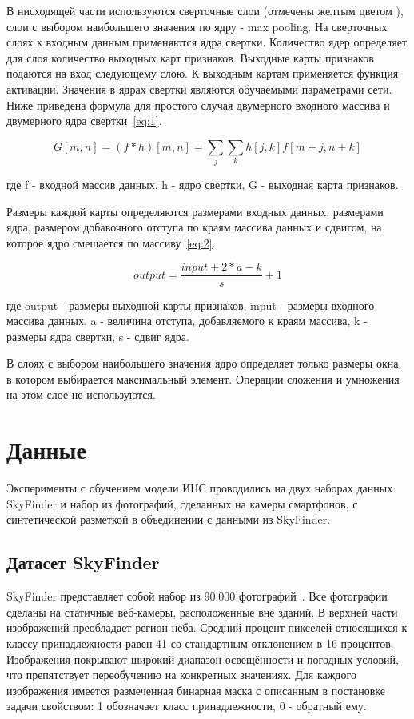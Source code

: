 В нисходящей части используются сверточные слои (отмечены желтым цветом ), слои с выбором наибольшего значения по ядру - max pooling.
На сверточных слоях к входным данным применяются ядра свертки.
Количество ядер определяет для слоя количество выходных карт признаков.
Выходные карты признаков подаются на вход следующему слою.
К выходным картам применяется функция активации.
Значения в ядрах свертки являются обучаемыми параметрами сети.
Ниже приведена формула для простого случая двумерного входного массива и двумерного ядра свертки~\eqref{eq:1}.

\begin{equation}
    \label{eq:1}
    G[m, n] = (f*h)[m, n] = \sum_{j}{\sum_{k}{h[j, k]f[m + j, n + k]}}
\end{equation}

где f - входной массив данных, h - ядро свертки, G - выходная карта признаков.

Размеры каждой карты определяются размерами входных данных, размерами ядра, размером добавочного отступа по краям массива данных и сдвигом,
на которое ядро смещается по массиву~\eqref{eq:2}.

\begin{equation}
    \label{eq:2}
    output = \frac{input + 2 * a - k}{s} + 1
\end{equation}

где output - размеры выходной карты признаков, input - размеры входного массива данных, a - величина отступа, добавляемого к краям массива,
k - размеры ядра свертки, s - сдвиг ядра.

В слоях с выбором наибольшего значения ядро определяет только размеры окна, в котором выбирается максимальный элемент.
Операции сложения и умножения на этом слое не используются.


\section{Данные}

Эксперименты с обучением модели ИНС проводились на двух наборах данных: SkyFinder и набор из фотографий, сделанных на камеры смартфонов,
с синтетической разметкой в объединении с данными из SkyFinder.

\subsection{Датасет SkyFinder}

SkyFinder представляет собой набор из 90.000 фотографий~\autocite{mihail2016sky}.
Все фотографии сделаны на статичные веб-камеры, расположенные вне зданий.
В верхней части изображений преобладает регион неба.
Средний процент пикселей относящихся к классу принадлежности равен 41 со стандартным отклонением в 16 процентов.
Изображения покрывают широкий диапазон освещённости и погодных условий, что препятствует переобучению на конкретных значениях.
Для каждого изображения имеется размеченная бинарная маска с описанным в постановке задачи свойством: 1 обозначает класс принадлежности, 0 - обратный ему.

